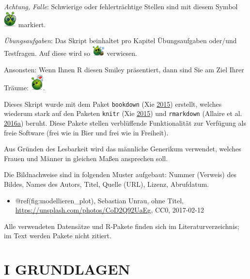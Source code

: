 \documentclass[12pt,]{book}
\providecommand{\tightlist}{%
  \setlength{\itemsep}{0pt}\setlength{\parskip}{0pt}}
\begin{document}
\emph{Achtung, Falle}: Schwierige oder fehlerträchtige Stellen sind mit
diesem Symbol
\includegraphics[width=0.05000\textwidth]{images/caution.png} markiert.

\emph{Übungsaufgaben}: Das Skript beinhaltet pro Kapitel Übungsaufgaben
oder/und Testfragen. Auf diese wird so
\includegraphics[width=0.05000\textwidth]{images/exercises.png}
verwiesen.

Ansonsten: Wenn Ihnen R diesen Smiley präsentiert, dann sind Sie am Ziel
Ihrer Träume:
\includegraphics[width=0.05000\textwidth]{images/love.png}.

Dieses Skript wurde mit dem Paket \texttt{bookdown} (Xie
\protect\hyperlink{ref-xie2015}{2015}) erstellt, welches wiederum stark
auf den Paketen \texttt{knitr} (Xie
\protect\hyperlink{ref-xie2015}{2015}) und \texttt{rmarkdown} (Allaire
et al.
\protect\hyperlink{ref-rmarkdown}{2016}\protect\hyperlink{ref-rmarkdown}{a})
beruht. Diese Pakete stellen verblüffende Funktionalität zur Verfügung
als freie Software (frei wie in Bier und frei wie in Freiheit).

Aus Gründen des Lesbarkeit wird das männliche Generikum verwendet,
welches Frauen und Männer in gleichen Maßen ansprechen soll.

Die Bildnachweise sind in folgenden Muster aufgebaut: Nummer (Verweis)
des Bildes, Names des Autors, Titel, Quelle (URL), Lizenz, Abrufdatum.

\begin{itemize}
\tightlist
\item
  @ref(fig:modellieren\_plot), Sebastian Unrau, ohne Titel,
  \url{https://unsplash.com/photos/CoD2Q92UaEg}, CC0, 2017-02-12
\end{itemize}

Alle verwendeten Datensätze und R-Pakete finden sich im
Literaturverzeichnis; im Text werden Pakete nicht zitiert.


\chapter*{I GRUNDLAGEN}\label{i-grundlagen}
\end{document}
